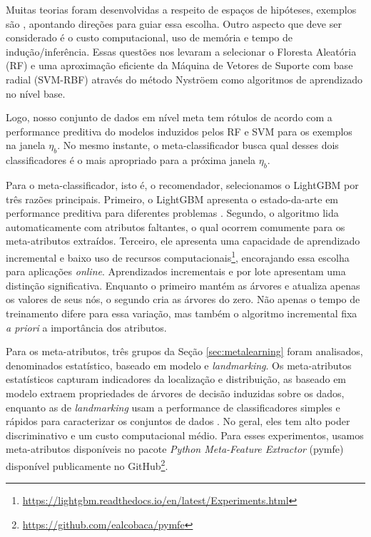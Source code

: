 Muitas teorias foram desenvolvidas a respeito de espaços de hipóteses, exemplos são \cite{vapnik2013nature, valiant1984theory}, apontando direções para guiar essa escolha. Outro aspecto que deve ser considerado é o custo computacional, uso de memória e tempo de indução/inferência. Essas questões nos levaram a selecionar o Floresta Aleatória (RF) \cite{Breiman2001} e uma aproximação eficiente da Máquina de Vetores de Suporte com base radial (SVM-RBF) através do método Nystr\"oem \cite{williams2001using} como algoritmos de aprendizado no nível base.

Logo, nosso conjunto de dados em nível meta tem rótulos de acordo com a performance preditiva do modelos induzidos pelos RF e SVM para os exemplos na janela $\eta_b$. No mesmo instante, o meta-classificador busca qual desses dois classificadores é o mais apropriado para a próxima janela $\eta_b$.

Para o meta-classificador, isto é, o recomendador, selecionamos o LightGBM por três razões principais. Primeiro, o LightGBM apresenta o estado-da-arte em performance preditiva para diferentes problemas \cite{ke2017lightgbm}. Segundo, o algoritmo lida automaticamente com atributos faltantes, o qual ocorrem comumente para os meta-atributos extraídos. Terceiro, ele apresenta uma capacidade de aprendizado incremental e baixo uso de recursos computacionais\footnote{\url{https://lightgbm.readthedocs.io/en/latest/Experiments.html}}, encorajando essa escolha para aplicações \textit{online}. Aprendizados incrementais e por lote apresentam uma distinção significativa. Enquanto o primeiro mantém as árvores e atualiza apenas os valores de seus nós, o segundo cria as árvores do zero. Não apenas o tempo de treinamento difere para essa variação, mas também o algoritmo incremental fixa \textit{a priori} a importância dos atributos.

Para os meta-atributos, três grupos da Seção \ref{sec:metalearning} foram analisados, denominados estatístico, baseado em modelo e \textit{landmarking}. Os meta-atributos estatísticos capturam indicadores da localização e distribuição, as baseado em modelo extraem propriedades de árvores de decisão induzidas sobre os dados, enquanto as de \textit{landmarking} usam a performance de classificadores simples e rápidos para caracterizar os conjuntos de dados \cite{Rivolli2018}. No geral, eles tem alto poder discriminativo e um custo computacional médio. Para esses experimentos, usamos meta-atributos disponíveis no pacote \textit{Python Meta-Feature Extractor} (pymfe) \cite{pymfe2020} disponível publicamente no GitHub\footnote{\url{https://github.com/ealcobaca/pymfe}}.

